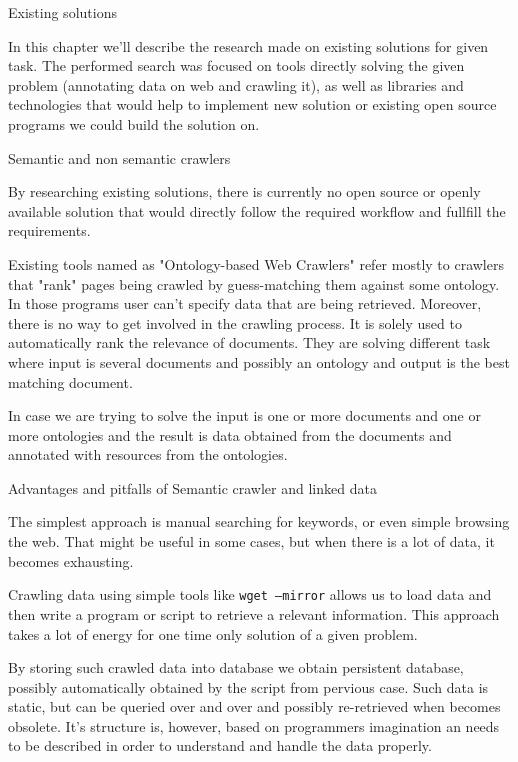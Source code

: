
\chap Existing solutions

In this chapter we'll describe the research made on existing solutions for
given task. The performed search was focused on tools directly solving the 
given problem (annotating data on web and crawling it), as well as libraries
and technologies that would help to implement new solution or existing open 
source programs we could build the solution on. 


\sec Semantic and non semantic crawlers

By researching existing solutions, there is currently no open source or openly
available solution that would directly follow the required workflow and
fullfill the requirements. 

Existing tools named as "Ontology-based Web Crawlers" refer mostly to crawlers
that "rank" pages being crawled by guess-matching them against some ontology.
In those programs user can't specify data that are being retrieved. Moreover,
there is no way to get involved in the crawling process. It is solely used to
automatically rank the relevance of documents. They are solving different task
where input is several documents and possibly an ontology and output is the
best matching document. 

In case we are trying to solve the input is one or more documents and one or
more ontologies and the result is data obtained from the documents and
annotated with resources from the ontologies. 


\sec Advantages and pitfalls of Semantic crawler and linked data

The simplest approach is manual searching for keywords, or even simple browsing
the web. That might be useful in some cases, but when there is a lot of data,
it becomes exhausting. 

Crawling data using simple tools like {\tt wget --mirror} allows us to load data
and then write a program or script to retrieve a relevant information. This
approach takes a lot of energy for one time only solution of a given problem. 

By storing such crawled data into database we obtain persistent database,
possibly automatically obtained by the script from pervious case. Such data is
static, but can be queried over and over and possibly re-retrieved when becomes
obsolete. It's structure is, however, based on programmers imagination an
needs to be described in order to understand and handle the data properly. 

